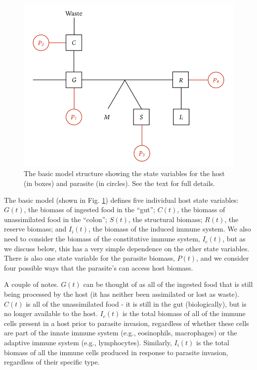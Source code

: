 \documentclass[12pt,reqno,final,pdftex]{amsart}\usepackage[]{graphicx}\usepackage[]{color}
\theoremstyle{plain}
\numberwithin{equation}{part}
\begin{document}
\begin{figure}
\includegraphics[width=\textwidth]{Macroparasite_DEB.png}
\caption{The basic model structure showing the state variables for the host (in boxes) and parasite (in circles). See the text for full details.}
\label{fig:model}
\end{figure}

The basic model (shown in Fig. \ref{fig:model}) defines five individual host state variables: $G(t)$, the biomass of ingested food in the ``gut''; $C(t)$, the biomass of unassimilated food in the ``colon''; $S(t)$, the structural biomass; $R(t)$, the reserve biomass; and $I_i(t)$, the biomass of the induced immune system.
We also need to consider the biomass of the constitutive immune system, $I_c(t)$, but as we discuss below, this has a very simple dependence on the other state variables.
There is also one state variable for the parasite biomass, $P(t)$, and we consider four possible ways that the parasite's can access host biomass.

A couple of notes.
$G(t)$ can be thought of as all of the ingested food that is still being processed by the host (it has neither been assimilated or lost as waste).
$C(t)$ is all of the unassimilated food - it is still in the gut (biologically), but is no longer available to the host.
$I_c(t)$ is the total biomass of all of the immune cells present in a host prior to parasite invasion, regardless of whether these cells are part of the innate immune system (e.g., eosinophils, macrophages) or the adaptive immune system (e.g., lymphocytes).
Similarly, $I_i(t)$ is the total biomass of all the immune cells produced in response to parasite invasion, regardless of their specific type.
\end{document}
